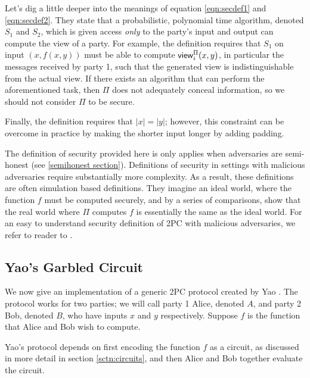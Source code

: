 \documentclass[12pt,twoside]{reedthesis}
\newcommand{\viewrv}{{\sf view}}
\begin{document}
\begin{description}
    Let's dig a little deeper into the meanings of equation \ref{eqn:secdef1} and \ref{eqn:secdef2}.
    They state that a probabilistic, polynomial time algorithm, denoted $S_1$ and $S_2$, which is given access \textit{only} to the party's input and output can compute the view of a party.
    For example, the definition requires that $S_1$ on input $(x, f(x,y))$ must be able to compute $\viewrv^{\Pi}_i(x,y)$, in particular the messages received by party 1, such that the generated view is indistinguishable from the actual view.
If there exists an algorithm that can perform the aforementioned task, then $\Pi$ does not adequately conceal information, so we should not consider $\Pi$ to be secure.

    Finally, the definition requires that $|x| = |y|$; however, this constraint can be overcome in practice by making the shorter input longer by adding padding.
\end{description}

The definition of security provided here is only applies when adversaries are semi-honest (see \ref{semihonest section}).
Definitions of security in settings with malicious adversaries require substantially more complexity.
As a result, these definitions are often simulation based definitions.
They imagine an ideal world, where the function $f$ must be computed securely, and by a series of comparisons, show that the real world where $\Pi$ computes $f$ is essentially the same as the ideal world.
For an easy to understand security definition of 2PC with malicious adversaries, we refer to reader to \cite{lindell2009}.

\subsection{Yao's Garbled Circuit}
We now give an implementation of a generic 2PC protocol created by Yao \cite{yao}.
The protocol works for two parties; we will call party 1 Alice, denoted $A$, and party 2 Bob, denoted $B$, who have inputs $x$ and $y$ respectively.
Suppose $f$ is the function that Alice and Bob wish to compute.

Yao's protocol depends on first encoding the function $f$ as a circuit, as discussed in more detail in section \ref{sctn:circuits}, and then Alice and Bob together evaluate the circuit.

\end{document}

